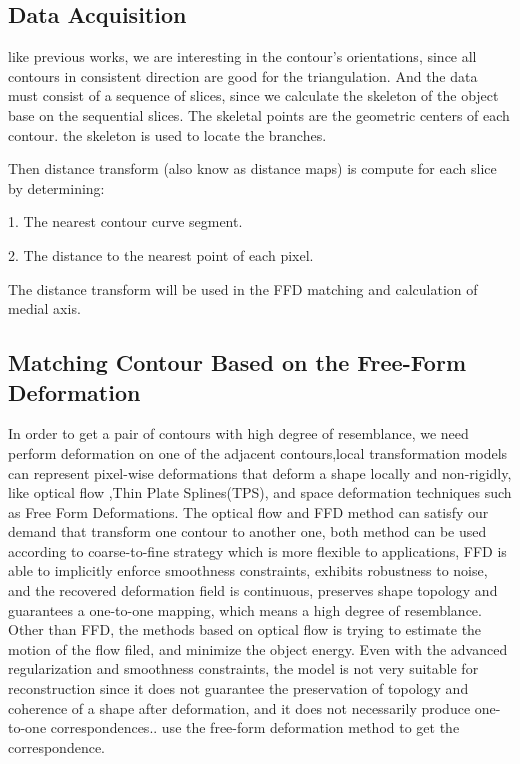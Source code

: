 \documentclass[3p,times]{elsarticle}
\begin{document}
\subsection{Data Acquisition}
like previous works, we are interesting in the contour's
orientations, since all contours in consistent direction are good for the
triangulation. And the data must consist of a sequence of
slices, since we calculate the skeleton of the object base on the
sequential slices. The skeletal points are the
geometric centers of each contour. the skeleton is used to locate the
branches.

Then distance transform (also know as distance maps) is compute for each slice by determining:

1. The nearest contour curve segment.

2. The distance to the nearest point of each pixel.

The distance transform will be used in the FFD matching and calculation of medial axis.
\subsection{Matching Contour Based on the Free-Form Deformation}
\label{ffd}
In order to get a pair of contours with high degree of resemblance, we
need perform deformation on one of the adjacent contours,local
transformation models can represent pixel-wise deformations that
deform a shape locally and non-rigidly, like optical flow
\cite{paragios_non-rigid_2003}\cite{xu_deformation_2010},Thin Plate
Splines(TPS)\cite{belongie_matching_2001}\cite{roth_registration_2013},
and space deformation techniques such as Free Form
Deformations\cite{huang_shape_2006}. The optical flow and FFD method
can satisfy our demand that transform one contour to another one, both
method can be used according to coarse-to-fine strategy which is more
flexible to applications, FFD is able to implicitly enforce
smoothness constraints, exhibits robustness to noise, and the
recovered deformation field is continuous, preserves shape topology and guarantees a one-to-one mapping, which means a high degree of
resemblance. Other than FFD, the methods based on optical flow is
trying to estimate the motion of the flow filed, and minimize the
object energy. Even with the advanced
regularization and smoothness constraints, the model is not very
suitable for reconstruction since it does not guarantee the
preservation of topology and coherence of a shape after
deformation\cite{paragios_non-rigid_2003}, and it does not
necessarily produce one-to-one correspondences.\cite{huang_shape_2006}.
use the free-form deformation method to get the correspondence.
\end{document}
